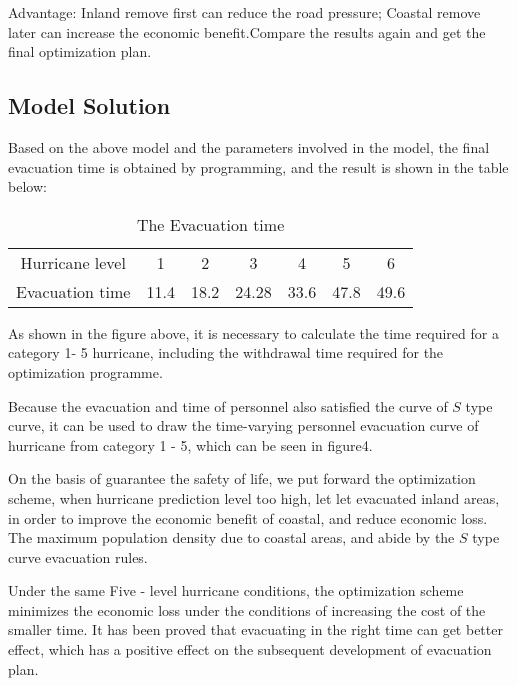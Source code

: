 \documentclass{mcmthesis}
\begin{document}
Advantage: Inland remove first can reduce the road pressure; Coastal remove later can increase the economic benefit.Compare the results again and get the final optimization plan.

\subsection{Model Solution}
Based on the above model and the parameters involved in the model, the final evacuation time is obtained by programming, and the result is shown in the table below:
\begin{table}[!htb]
\centering
\setlength{\abovecaptionskip}{0pt}%
\setlength{\belowcaptionskip}{10pt}%
\caption{The Evacuation time}
\begin{tabular}{ccccccc}
\toprule[1.5pt]
Hurricane level &1&2&3&4&5&6\\
Evacuation time &11.4&18.2&24.28&33.6&47.8&49.6\\
\bottomrule[1.5pt]
\end{tabular}
\end{table}



As shown in the figure above, it is necessary to calculate the time required for a category 1- 5 hurricane, including the withdrawal time required for the optimization programme.

Because the evacuation and time of personnel also satisfied the curve of $S$ type curve, it can be used to draw the time-varying personnel evacuation curve of hurricane from category 1 - 5, which can be seen in figure4.



On the basis of guarantee the safety of life, we put forward the optimization scheme, when hurricane prediction level too high, let let evacuated inland areas, in order to improve the economic benefit of coastal, and reduce economic loss. The maximum population density due to coastal areas, and abide by the $S$ type curve evacuation rules.


Under the same Five - level hurricane conditions, the optimization scheme minimizes the economic loss under the conditions of increasing the cost of the smaller time. It has been proved that evacuating in the right time can get better effect, which has a positive effect on the subsequent development of evacuation plan.
\end{document}
